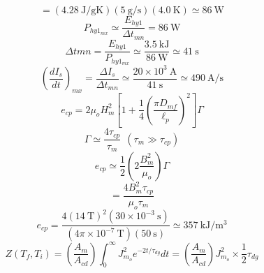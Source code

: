 \begin{equation}%
=(4.28\ \mathrm{J/gK})(5\ \mathrm{g/s})(4.0\ \mathrm{K})\simeq86\ \mathrm{W}
\end{equation}
\begin{equation}%
P_{hy1_{mx}}\simeq\frac{E_{hy1}}{\Delta t_{mn}}=86\ \mathrm{W}
\end{equation}
\begin{equation}%
\Delta t{mn}=\frac{E_{hy1}}{P_{hy1_{mx}}}\simeq\frac{3.5\ \mathrm{kJ}}{86\ \mathrm{W}}\simeq41\ \mathrm{s}
\end{equation}
\begin{equation}%
(\frac{dI_s}{dt})_{mx}=\frac{\Delta I_s}{\Delta t_{mn}}\simeq\frac{20\times10^3\ \mathrm{A}}{41\ \mathrm{s}}\simeq490\ \mathrm{A/s}
\end{equation}
\begin{equation}%
e_{cp}=2\mu_oH_{m}^2[1+\frac{1}{4}(\frac{\pi D_{mf}}{\ell_p})^2]\Gamma
\end{equation}
\begin{equation}%
\Gamma\simeq\frac{4\tau_{cp}}{\tau_m}\   \  (\tau_m\gg \tau_{cp})
\end{equation}
\begin{equation}%
e_{cp}\simeq\frac{1}{2}(2\frac{B_m^2}{\mu_o})\Gamma
\end{equation}
\begin{equation}%
=\frac{4B_m^2\tau_{cp}}{\mu_o\tau_m}
\end{equation}
\begin{equation}%
e_{cp}=\frac{4(14\ \mathrm{T})^2(30\times10^{-3}\ \mathrm{s})}{(4\pi\times10^{-7}\ \mathrm{T})(50\ \mathrm{s})}\simeq357\ \mathrm{kJ/m^3}
\end{equation}
\begin{equation}%
Z(T_f,T_i)=(\frac{A_m}{A_{cd}})\int_{0}^{\infty}J_{m_o}^2e^{-2t/\tau_{dg}}dt=(\frac{A_m}{A_{cd}})J_{m_o}^2\times\frac{1}{2}\tau_{dg}
\end{equation}



